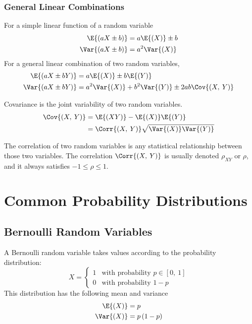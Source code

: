 \documentclass{article}
\begin{document}
\subsubsection{General Linear Combinations}
For a simple linear function of a random variable
\begin{align*}
    \E{\left( aX \pm b \right)}   & = a\E{\left( X \right)} \pm b \\
    \Var{\left( aX \pm b \right)} & = a^2\Var{\left( X \right)}
\end{align*}
For a general linear combination of two random variables,
\begin{align*}
    \E{\left( aX \pm bY \right)}   & = a\E{\left( X \right)} \pm b\E{\left( Y \right)}                                           \\
    \Var{\left( aX \pm bY \right)} & = a^2\Var{\left( X \right)} + b^2\Var{\left( Y \right)} \pm 2ab \Cov{\left( X,\: Y \right)}
\end{align*}
\begin{definition}[Covariance]
    Covariance is the joint variability of two random variables.
    \begin{align*}
        \Cov{\left( X,\: Y \right)} & = \E{\left( XY \right)} - \E{\left( X \right)} \E{\left( Y \right)}                 \\
                                    & = \Corr{\left( X,\: Y \right)} \sqrt{\Var{\left( X \right)} \Var{\left( Y \right)}}
    \end{align*}
\end{definition}
\begin{definition}[Correlation]
    The correlation of two random variables is any statistical \linebreak relationship between
    those two variables. The correlation $\Corr{\left( X,\: Y \right)}$ is usually denoted $\rho_{XY}$ or $\rho$,
    and it always satisfies $-1 \leq\rho\leq 1$.
\end{definition}
\section{Common Probability Distributions}
\subsection{Bernoulli Random Variables}
A Bernoulli random variable takes values according to the probability distribution:
\begin{equation*}
    X =
    \begin{cases}
        1 & \text{with probability $p\in\left[ 0,\: 1 \right]$} \\
        0 & \text{with probability $1 - p$}
    \end{cases}
\end{equation*}
This distribution has the following mean and variance
\begin{align*}
    \E{\left( X \right)}   & = p                     \\
    \Var{\left( X \right)} & = p\left( 1 - p \right)
\end{align*}
\end{document}
